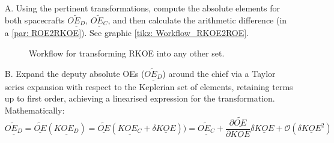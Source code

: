 \begin{itemize}
\item[A.] Using the pertinent transformations, compute the absolute elements for both spacecrafts $\underline{\widetilde{OE_D}}$, $\underline{\widetilde{OE_C}}$, and then calculate the arithmetic difference (in a \ref{par: 	ROE2RKOE}). See graphic \ref{tikz: 	Workflow_RKOE2ROE}.
%
\begin{figure}[!htb]
\centering
{}
\caption{Workflow for transforming RKOE into any other set.}
\label{tikz: 	Workflow_RKOE2ROE}
\end{figure}
%
\item[B.] Expand the deputy absolute OEs (\ie $\underline{\widetilde{OE_D}}$) around the chief via a Taylor series expansion with respect to the Keplerian set of elements, retaining terms up to first order, achieving a linearised expression for the transformation. Mathematically:
%
\[
\underline{\widetilde{OE_D}} = \underline{\widetilde{OE}}(\underline{KOE_D}) = \underline{\widetilde{OE}}(\underline{KOE_C} + \delta \underline{KOE})) = \underline{\widetilde{OE_C}} + \dfrac{\partial \underline{\widetilde{OE}}}{\partial \underline{KOE}} \delta \underline{KOE} + \mathcal{O} \left( \delta \underline{KOE}^2 \right) 
\]
\end{itemize}
